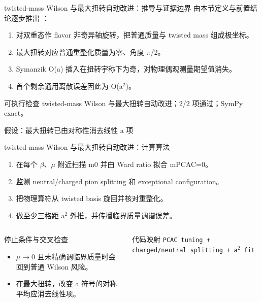 \begin{frame}[t]{twisted-mass Wilson 与最大扭转自动改进：推导与证据边界}
\footnotesize
{}\quad 由本节定义与前置结论逐步推出 ：
\begin{enumerate}
\item 对双重态作 flavor 非奇异轴旋转，把普通质量与 twisted mass 组成极坐标。
\item 最大扭转对应普通重整化质量为零、角度 \ensuremath{\pi}/\allowbreak{}2。
\item Symanzik O(a) 插入在扭转宇称下为奇，对物理偶观测量期望值消失。
\item 首个剩余通用离散误差因此为 O(a\ensuremath{^{2}})。
\end{enumerate}\begin{block}{可执行检查}
\quad twisted-mass Wilson 与最大扭转自动改进；2/2 项通过；SymPy exact。
\par\scriptsize 假设：最大扭转已由对称性消去线性 a 项
\end{block}
\end{frame}

\begin{frame}[t]{twisted-mass Wilson 与最大扭转自动改进：计算算法}
\footnotesize
{}\begin{enumerate}
\item 在每个 \ensuremath{\beta}、\ensuremath{\mu} 附近扫描 m0 并由 Ward ratio 拟合 mPCAC=0。
\item 监测 neutral/\allowbreak{}charged pion splitting 和 exceptional configuration。
\item 把物理算符从 twisted basis 旋回并核对重整化。
\item 做至少三格距 a\ensuremath{^{2}} 外推，并传播临界质量调谐误差。
\end{enumerate}\begin{columns}[T,onlytextwidth]
\begin{block}{停止条件与交叉检查}\scriptsize\begin{itemize}
\item[\CheckMark] \ensuremath{\mu}\ensuremath{\rightarrow}0 且未精确调临界质量时会回到普通 Wilson 风险。
\item[\CheckMark] 在最大扭转，改变 a 符号的对称平均应消去线性项。
\end{itemize}\end{block}
\begin{block}{代码映射}
\scriptsize \texttt{PCAC tuning + charged/\allowbreak{}neutral splitting + a\ensuremath{^{2}} fit}
\end{block}\end{columns}\end{frame}

